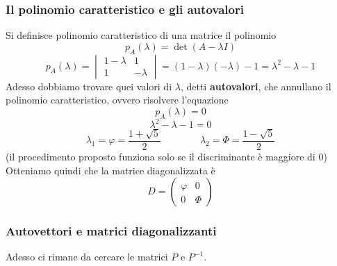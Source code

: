 \documentclass{article}     %
\begin{document}
\subsubsection{Il polinomio caratteristico e gli autovalori}
Si definisce polinomio caratteristico di una matrice il polinomio
\[p_A(\lambda) = \det\left( A -\lambda I \right)\]
\[p_A(\lambda) =\begin{vmatrix} 1 -\lambda&1\\1&-\lambda \end{vmatrix} = (1 -\lambda)( -\lambda) - 1 =\lambda^2 -\lambda - 1\]
Adesso dobbiamo trovare quei valori di $\lambda$, detti \textbf{autovalori}, che annullano il polinomio caratteristico, ovvero risolvere l'equazione 
\[p_A(\lambda) = 0\]
\[\lambda^2 -\lambda - 1 = 0\] 
\[\lambda_1 =\varphi =\frac{1 + \sqrt{5}}{2}\qquad\qquad\lambda_2 =\Phi =\frac{1 - \sqrt{5}}{2}\]
(il procedimento proposto funziona solo se il discriminante è maggiore di 0)
Otteniamo quindi che la matrice diagonalizzata è
\[D =\begin{pmatrix} \varphi &0\\0&\Phi \end{pmatrix} \]
\subsubsection{Autovettori e matrici diagonalizzanti}
Adesso ci rimane da cercare le matrici $P$ e $P^{-1}$.
\end{document}
